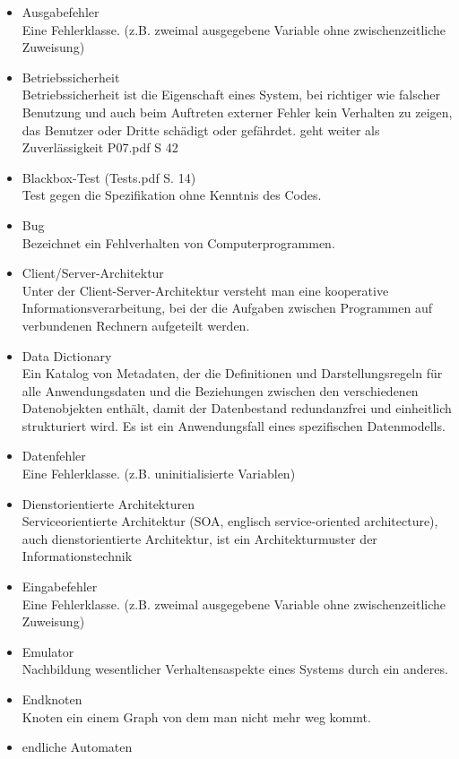 \begin{itemize}
\item Ausgabefehler \\ Eine Fehlerklasse. (z.B. zweimal ausgegebene Variable ohne zwischenzeitliche Zuweisung)
\item 	Betriebssicherheit \\ Betriebssicherheit ist die Eigenschaft eines System, bei richtiger wie falscher Benutzung und auch beim Auftreten externer Fehler kein Verhalten zu zeigen, das Benutzer oder Dritte schädigt oder  gefährdet. geht weiter als Zuverlässigkeit P07.pdf S 42
\item 	Blackbox-Test (Tests.pdf S. 14)\\
Test gegen die Spezifikation ohne Kenntnis des Codes.
\item 	Bug\\
Bezeichnet ein Fehlverhalten von Computerprogrammen.
\item 	Client/Server-Architektur\\
Unter der Client-Server-Architektur versteht man eine kooperative Informationsverarbeitung, bei der die Aufgaben zwischen Programmen auf verbundenen Rechnern aufgeteilt werden.
\item 	Data Dictionary\\
Ein Katalog von Metadaten, der die Definitionen und Darstellungsregeln für alle Anwendungsdaten und die Beziehungen zwischen den verschiedenen Datenobjekten enthält, damit der Datenbestand redundanzfrei und einheitlich strukturiert wird. Es ist ein Anwendungsfall eines spezifischen Datenmodells.
\item Datenfehler \\ Eine Fehlerklasse. (z.B. uninitialisierte Variablen)
\item 	Dienstorientierte Architekturen\\
Serviceorientierte Architektur (SOA, englisch service-oriented architecture), auch dienstorientierte Architektur, ist ein Architekturmuster der Informationstechnik
\item Eingabefehler  \\ Eine Fehlerklasse. (z.B. zweimal ausgegebene Variable ohne zwischenzeitliche Zuweisung)
\item 	Emulator\\
Nachbildung wesentlicher Verhaltensaspekte eines Systems durch ein anderes.
\item 	Endknoten\\
Knoten ein einem Graph von dem man nicht mehr weg kommt.
\item 	endliche Automaten\\

\end{itemize}
